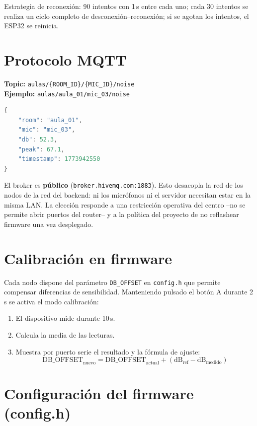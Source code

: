 \documentclass[11pt,a4paper,openany]{report}
\begin{document}
Estrategia de reconexi\'on: 90 intentos con 1\,s entre cada uno; cada 30 intentos se realiza un ciclo completo de desconexi\'on--reconexi\'on; si se agotan los intentos, el ESP32 se reinicia.

\section{Protocolo MQTT}

\textbf{Topic:} \texttt{aulas/\{ROOM\_ID\}/\{MIC\_ID\}/noise} \\
\textbf{Ejemplo:} \texttt{aulas/aula\_01/mic\_03/noise}

\begin{lstlisting}[language=Java, caption={Mensaje MQTT publicado por un nodo}]
{
    "room": "aula_01",
    "mic": "mic_03",
    "db": 52.3,
    "peak": 67.1,
    "timestamp": 1773942550
}
\end{lstlisting}

El broker es \textbf{p\'ublico} (\texttt{broker.hivemq.com:1883}). Esto desacopla la red de los nodos de la red del backend: ni los micr\'ofonos ni el servidor necesitan estar en la misma LAN. La elecci\'on responde a una restricci\'on operativa del centro --no se permite abrir puertos del router-- y a la pol\'itica del proyecto de no reflashear firmware una vez desplegado.

\section{Calibraci\'on en firmware}

Cada nodo dispone del par\'ametro \texttt{DB\_OFFSET} en \texttt{config.h} que permite compensar diferencias de sensibilidad. Manteniendo pulsado el bot\'on A durante 2\,s se activa el modo calibraci\'on:

\begin{enumerate}
    \item El dispositivo mide durante 10\,s.
    \item Calcula la media de las lecturas.
    \item Muestra por puerto serie el resultado y la f\'ormula de ajuste:
    $$\text{DB\_OFFSET}_{\text{nuevo}} = \text{DB\_OFFSET}_{\text{actual}} + (\text{dB}_{\text{ref}} - \text{dB}_{\text{medido}})$$
\end{enumerate}

\section{Configuraci\'on del firmware (config.h)}
\end{document}
